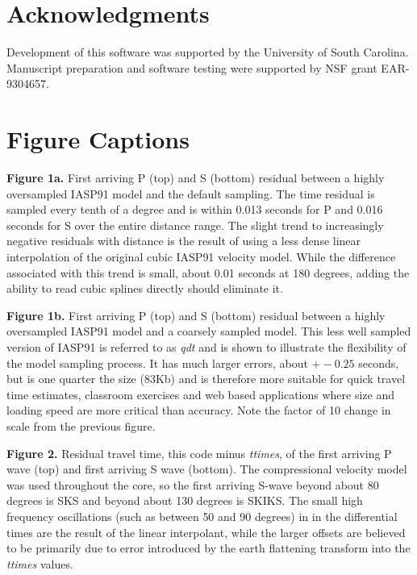 \section*{Acknowledgments}
Development of this software was supported by the University of South Carolina.
Manuscript preparation and software testing were supported by NSF grant EAR-9304657.




\clearpage

\section*{Figure Captions}

\textbf{Figure 1a.}
First arriving P (top) and S (bottom) residual between a highly oversampled IASP91 model 
and the default sampling. 
The time residual is sampled every tenth of a 
degree and is within 0.013 seconds for P and 0.016 seconds for S
over the entire distance range. 
The slight trend to increasingly negative residuals with distance is the
result of using a less dense linear interpolation of the original cubic 
IASP91 velocity model. 
While the difference associated with this trend is 
small, about 0.01 seconds at 180 degrees, 
adding the ability to read cubic splines directly should eliminate it.

\textbf{Figure 1b.}
First arriving P (top) and S (bottom) residual between a highly oversampled IASP91 model 
and a coarsely sampled model. 
This less well sampled version of IASP91 is referred to as 
\textit{qdt} and is shown to illustrate the flexibility of the model sampling process.
It has much larger errors, about $ +- 0.25$ seconds, but is
one quarter the size (83Kb) and is therefore more suitable for 
quick travel time estimates, 
classroom exercises and web based applications where size and loading speed
are more critical than accuracy. 
Note the factor of 10 change in scale from the previous figure.

\textbf{Figure 2.}
Residual travel time, this code minus \textit{ttimes}, 
of the first arriving P wave (top) and first arriving S wave (bottom). 
The compressional velocity model was used throughout the core, so the first arriving S-wave
beyond about 80 degrees is SKS and beyond about 130 degrees is SKIKS.
The small high frequency oscillations (such as between 50 and 90 degrees) in
in the differential times are the result of the linear interpolant, while
the larger offsets are believed to be primarily due to error introduced 
by the earth flattening transform into the \textit{ttimes} values.

